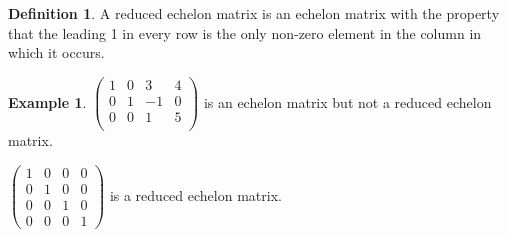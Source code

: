 \documentclass[11pt,a4paper]{article}
\theoremstyle{definition}
\newtheorem{defn}[thm]{Definition}
\newtheorem{exa}[thm]{Example}
\begin{document}
\begin{defn}
A reduced echelon matrix is an echelon matrix with the property that the leading 1 in every row is the only non-zero element in the column in which it occurs.
\end{defn}
\begin{exa}
$
\begin{pmatrix}
1&0&3&4\\0&1&-1&0\\0&0&1&5\\
\end{pmatrix}
$ is an echelon matrix but not a reduced echelon matrix.

$
\begin{pmatrix}
1&0&0&0\\0&1&0&0\\0&0&1&0\\0&0&0&1
\end{pmatrix}
$ is a reduced echelon matrix.
\end{exa}
\end{document}
